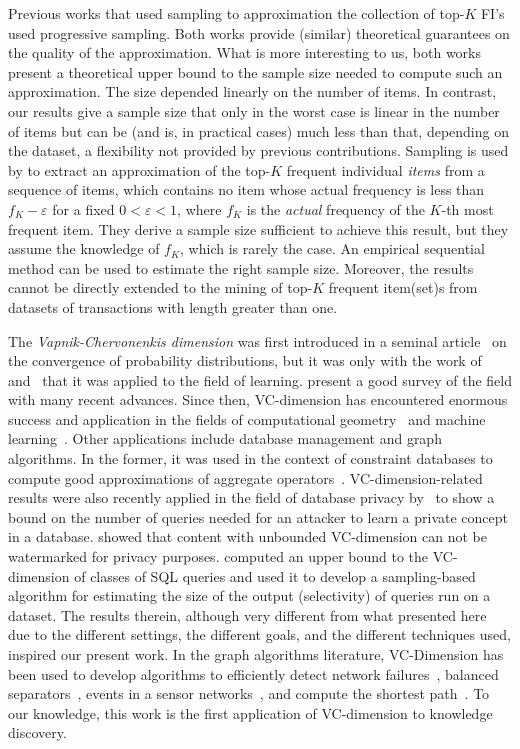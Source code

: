 Previous works that used sampling to approximation the collection of top-$K$
FI's~\citep{SchefferW02,PietracaprinaRUV10} used progressive sampling. Both
works provide (similar) theoretical guarantees on the quality of the
approximation. What is more interesting to us, both works present a theoretical
upper bound to the sample size needed to compute such an approximation. The size
depended linearly on the number of items. 
In contrast, our results give a sample size that only in the worst case is
linear in the number of items but can be (and is, in practical cases) much less
than that, depending on the dataset, a flexibility not provided by previous
contributions. 
Sampling is used by \citet{VasudevanV09} to extract
an approximation of the top-$K$ frequent individual \emph{items} from a sequence
of items, which contains no item whose actual frequency is less than
$f_K-\varepsilon$ for a fixed $0<\varepsilon<1$, where $f_K$ is the
\emph{actual} frequency of the $K$-th most frequent item. They derive a sample
size sufficient to achieve this result, but they assume the knowledge of $f_K$,
which is rarely the case. An empirical sequential method can be used to estimate
the right sample size. Moreover, the results cannot be directly extended to the
mining of top-$K$ frequent item(set)s from datasets of transactions with length
greater than one.

The {\em Vapnik-Chervonenkis dimension} was first introduced in a seminal
article~\citep{VapnikC71} on the convergence of probability distributions, but it
was only with the work of~\citet{HausslerW86} and~\citet{BlumerEHW89} that it
was applied to the field of learning. \citet{BoucheronBL05} present a good survey
of the field with many recent advances. Since then, VC-dimension has encountered
enormous success and application in the fields of computational
geometry~\citep{Chazelle00,Matousek02} and machine
learning~\citep{AnthonyB99,DevroyeGL96}. Other applications include
database management and graph algorithms. 
In the former, it was used in the
context of constraint databases to compute good approximations of aggregate
operators~\citep{BenediktL02}. VC-dimension-related
results were also recently applied in the field of database privacy
by~\citet{BlumLR08} to show a bound on the number of queries
needed for an attacker to learn a private concept in a database. \citet{Gross11}
showed that content with unbounded
VC-dimension can not be watermarked for privacy purposes.
\citet{RiondatoACZU11} computed an upper bound to the VC-dimension of
classes of SQL queries and used it to develop a sampling-based algorithm for
estimating the size of the output (selectivity) of queries run on a dataset.
The results therein, although very different from what presented here due to the
different settings, the different goals, and the different techniques used,
inspired our present work. 
In the graph algorithms literature, VC-Dimension has been used to develop
algorithms to efficiently detect network
failures~\citep{Kleinberg03,KleinbergSS08}, balanced separators~\citep{FeigeM06},
events in a sensor networks~\citep{GandhiSW10}, and compute the shortest
path~\citep{AbrahamDFGW11}. To our knowledge, this work is the
first application of VC-dimension to knowledge discovery.

